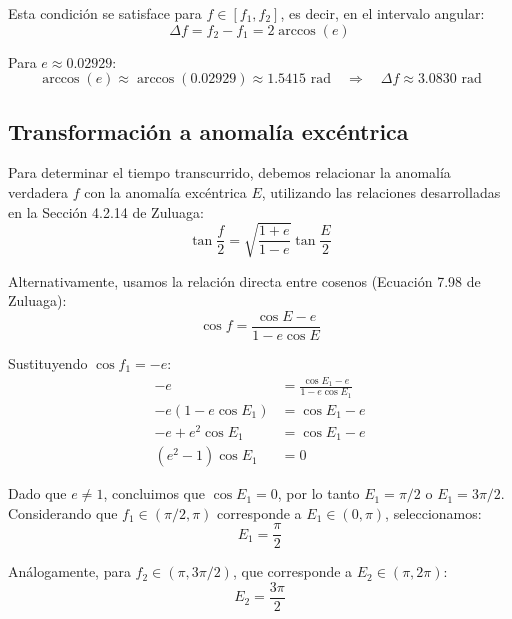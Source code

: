 \documentclass[12pt, a4paper]{article}
\begin{document}
Esta condición se satisface para $f \in [f_1, f_2]$, es decir, en el intervalo angular:
\begin{equation}
    \Delta f = f_2 - f_1 = 2\arccos(e)
\end{equation}

Para $e \approx 0.02929$:
\begin{equation}
    \arccos(e) \approx \arccos(0.02929) \approx 1.5415 \text{ rad} \quad \Rightarrow \quad \Delta f \approx 3.0830 \text{ rad}
\end{equation}

\subsection*{Transformación a anomalía excéntrica}

Para determinar el tiempo transcurrido, debemos relacionar la anomalía verdadera $f$ con la anomalía excéntrica $E$, utilizando las relaciones desarrolladas en la Sección 4.2.14 de Zuluaga:
\begin{equation}
    \tan\frac{f}{2} = \sqrt{\frac{1+e}{1-e}}\tan\frac{E}{2}
\end{equation}

Alternativamente, usamos la relación directa entre cosenos (Ecuación 7.98 de Zuluaga):
\begin{equation}
    \cos f = \frac{\cos E - e}{1 - e\cos E}
\end{equation}

Sustituyendo $\cos f_1 = -e$:
\begin{align}
    -e &= \frac{\cos E_1 - e}{1 - e\cos E_1} \\
    -e(1 - e\cos E_1) &= \cos E_1 - e \\
    -e + e^2\cos E_1 &= \cos E_1 - e \\
    (e^2 - 1)\cos E_1 &= 0
\end{align}

Dado que $e \neq 1$, concluimos que $\cos E_1 = 0$, por lo tanto $E_1 = \pi/2$ o $E_1 = 3\pi/2$. Considerando que $f_1 \in (\pi/2, \pi)$ corresponde a $E_1 \in (0, \pi)$, seleccionamos:
\begin{equation}
    E_1 = \frac{\pi}{2}
\end{equation}

Análogamente, para $f_2 \in (\pi, 3\pi/2)$, que corresponde a $E_2 \in (\pi, 2\pi)$:
\begin{equation}
    E_2 = \frac{3\pi}{2}
\end{equation}
\end{document}
